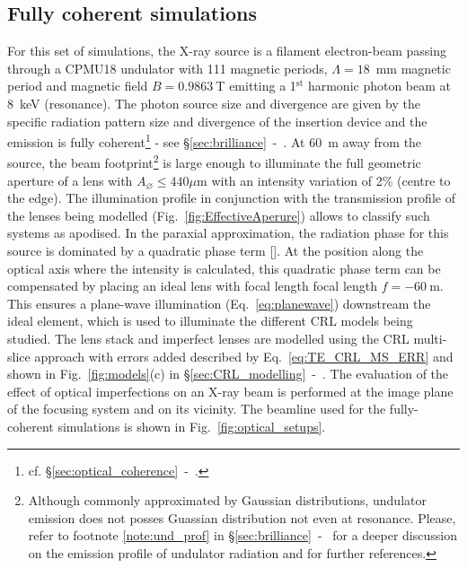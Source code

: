 \begin{refsection}
\section{Fully coherent simulations}\label{sec:coherent_sim}

For this set of simulations, the X-ray source is a filament electron-beam passing through a CPMU18 undulator with 111 magnetic periods, $\Lambda=18$~mm magnetic period and magnetic field $B=0.9863~$T emitting a 1$^\text{st}$ harmonic photon beam at 8~keV (resonance). The photon source size and divergence are given by the specific radiation
pattern size and divergence of the insertion device and the emission is fully coherent\footnote{cf. \S\ref{sec:optical_coherence}~-~\textit{}.}  - see \S\ref{sec:brilliance}~-~\textit{}. At 60~m away from the source, the beam footprint\footnote{Although commonly approximated by Gaussian distributions, undulator emission does not posses Guassian distribution not even at resonance. Please, refer to footnote \ref{note:und_prof} in \S\ref{sec:brilliance}~-~\textit{} for a deeper discussion on the emission profile of undulator radiation and for further references.} is large enough to illuminate the full geometric aperture of a lens with $A_{\diameter}\le440 \mu\text{m}$ with an intensity variation of 2\% (centre to the edge). The illumination profile in conjunction with the transmission profile of the lenses being modelled (Fig.~\ref{fig:EffectiveAperure}) allows to classify such systems as apodised. In the paraxial approximation, the radiation phase for this source is dominated by a quadratic phase term [\cite{Chubar1999, Chubar2001b, Chubar2019}]. At the position along the optical axis where the intensity is calculated, this quadratic phase term can be compensated by placing an ideal lens with focal length focal length $f=-60~$m. This ensures a plane-wave illumination (Eq.~\ref{eq:planewave}) downstream the ideal element, which is used to illuminate the different CRL models being studied. The lens stack and imperfect lenses are modelled using the CRL multi-slice approach with errors added described by Eq.~\ref{eq:TE_CRL_MS_ERR} and shown in Fig.~\ref{fig:models}(c) in \S\ref{sec:CRL_modelling}~-~\textit{}. The evaluation of the effect of optical imperfections on an X-ray beam is performed at the image plane of the focusing system and on its vicinity. The beamline used for the fully-coherent simulations is shown in  Fig.~\ref{fig:optical_setups}.


\end{refsection}
